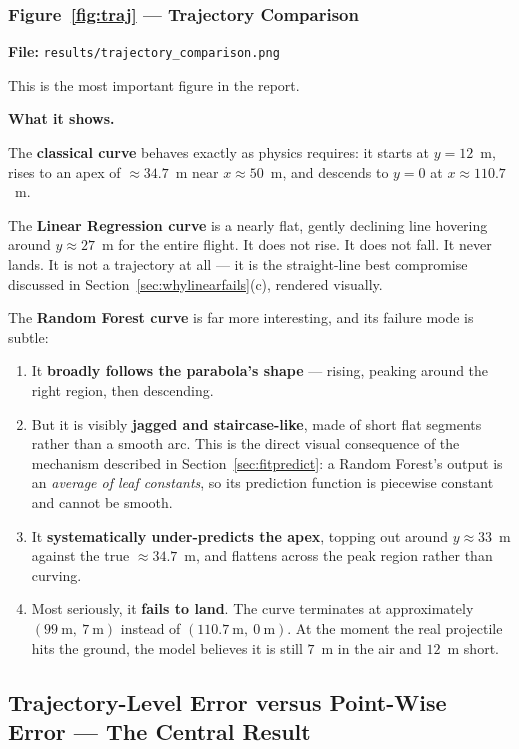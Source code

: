 \documentclass[11pt,a4paper]{article}
\begin{document}
\subsubsection*{Figure~\ref{fig:traj} --- Trajectory Comparison}
\textbf{File:} \texttt{results/trajectory\_comparison.png}

This is the most important figure in the report.

\textbf{What it shows.}

The \textbf{classical curve} behaves exactly as physics requires: it starts at $y=12$~m, rises to an
apex of ${\approx}34.7$~m near $x\approx50$~m, and descends to $y=0$ at $x\approx110.7$~m.

The \textbf{Linear Regression curve} is a nearly flat, gently declining line hovering around
$y\approx27$~m for the entire flight. It does not rise. It does not fall. It never lands. It is not
a trajectory at all --- it is the straight-line best compromise discussed in
Section~\ref{sec:whylinearfails}(c), rendered visually.

The \textbf{Random Forest curve} is far more interesting, and its failure mode is subtle:

\begin{enumerate}[leftmargin=2em,itemsep=0.2em]
  \item It \textbf{broadly follows the parabola's shape} --- rising, peaking around the right region,
        then descending.
  \item But it is visibly \textbf{jagged and staircase-like}, made of short flat segments rather than
        a smooth arc. This is the direct visual consequence of the mechanism described in
        Section~\ref{sec:fitpredict}: a Random Forest's output is an \emph{average of leaf
        constants}, so its prediction function is piecewise constant and cannot be smooth.
  \item It \textbf{systematically under-predicts the apex}, topping out around $y\approx33$~m against
        the true ${\approx}34.7$~m, and flattens across the peak region rather than curving.
  \item Most seriously, it \textbf{fails to land}. The curve terminates at approximately
        $(99\ \mathrm{m},\ 7\ \mathrm{m})$ instead of $(110.7\ \mathrm{m},\ 0\ \mathrm{m})$. At the
        moment the real projectile hits the ground, the model believes it is still $7$~m in the air
        and $12$~m short.
\end{enumerate}

\subsection{Trajectory-Level Error versus Point-Wise Error --- The Central Result}
\label{sec:centralresult}
\end{document}
